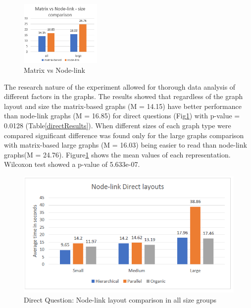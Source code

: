 \documentclass{l4proj}
\begin{document}
\begin{figure}
	\centering
	\vspace{-20mm}
    \includegraphics[width=0.35\textwidth]{images/directComparison.PNG}
    \caption{Matrix vs Node-link} 
	\label{directComparison}
\end{figure}


The research nature of the experiment allowed for thorough data analysis of different factors in the graphs. The results showed that regardless of the graph layout and size the matrix-based graphs (M = 14.15) have better performance than node-link graphs (M = 16.85) for direct questions (Fig\ref{directComparison}) with p-value = 0.0128 (Table\ref{directResults}). When different sizes of each graph type were compared significant difference was found only for the large graphs comparison with matrix-based large graphs (M = 16.03) being easier to read than node-link graphs(M = 24.76). Figure\ref{directComparison} shows the mean values of each representation. Wilcoxon test showed a p-value of 5.633e-07.


\begin{figure}[!ht]
    \includegraphics[width=13cm]{images/nodelinkdirectlayouts.PNG}
    \vspace{-15pt}
    \centering
    \caption{Direct Question: Node-link layout comparison in all size groups}
	\label{nodelinkdirectlayouts}
\end{figure}
\end{document}
